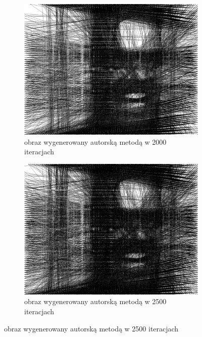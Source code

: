 \begin{figure}[H]
\begin{subfigure}{0.24\textwidth}
        \label{comp-comp-joker-shining-f}
    \end{subfigure}
    \begin{subfigure}{0.24\textwidth}
        \centering
        \includegraphics[width = \textwidth]{img/6-comp/shining_r_i2000_c20_inv0_bg10_obj1_ed1.png}
        \caption{obraz wygenerowany autorską metodą w 2000 iteracjach}
        \label{comp-comp-joker-shining-g}
    \end{subfigure}
    \begin{subfigure}{0.24\textwidth}
        \centering
        \includegraphics[width = \textwidth]{img/6-comp/shining_r_i2500_c20_inv0_bg10_obj1_ed1.png}
        \caption{obraz wygenerowany autorską metodą w 2500 iteracjach}

\end{subfigure}
\end{figure}
